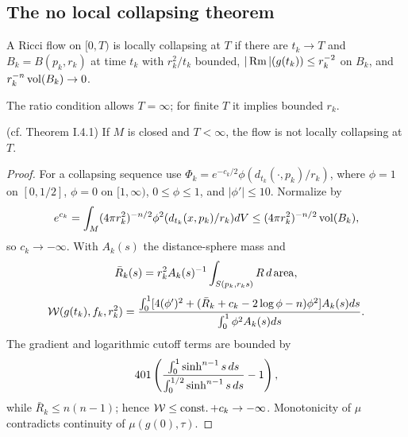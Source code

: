 \subsection{The no local collapsing theorem}
\begin{definition}
  \label{def:kl-no-local-collapsing-theorem-i-locally-collapsing-definition}
A Ricci flow on $[0,T)$ is locally collapsing at $T$ if there are $t_k\to T$ and
$B_k=B(p_k,r_k)$ at time $t_k$ with $r_k^2/t_k$ bounded,
$|\operatorname{Rm}|(g(t_k))\le r_k^{-2}$ on $B_k$, and $r_k^{-n}\operatorname{vol}(B_k)\to0$.
\end{definition}
\begin{remark}
  \label{rem:kl-no-local-collapsing-theorem-i-estimates-noncollapsing}
The ratio condition allows $T=\infty$; for finite $T$ it implies bounded $r_k$.
\end{remark}
\begin{theorem}
  \label{thm:kl-no-local-collapsing-theorem-i-noncollapsing-theorem}
  \label{noncollthm} (cf. Theorem I.4.1)
If $M$ is closed and $T<\infty$, the flow is not locally collapsing at $T$.
\end{theorem}
\begin{proof}
\sketch
For a collapsing sequence use $\Phi_k=e^{-c_k/2}\phi(d_{t_k}(\cdot,p_k)/r_k)$, where
$\phi=1$ on $[0,1/2]$, $\phi=0$ on $[1,\infty)$, $0\le\phi\le1$, and
$|\phi'|\le10$. Normalize by
\begin{equation}\label{normalization}
e^{c_k}=\int_M(4\pi r_k^2)^{-n/2}\phi^2(d_{t_k}(x,p_k)/r_k)dV
\le(4\pi r_k^2)^{-n/2}\operatorname{vol}(B_k),
\end{equation}
so $c_k\to-\infty$. With $A_k(s)$ the distance-sphere mass and
\begin{equation}
\bar R_k(s)=r_k^2A_k(s)^{-1}\int_{S(p_k,r_ks)}R\,d\operatorname{area},
\end{equation}
\begin{equation}\label{mess}
{\mathcal W}(g(t_k),f_k,r_k^2)=
{\int_0^1[4(\phi')^2+(\bar R_k+c_k-2\log\phi-n)\phi^2]A_k(s)ds\over\int_0^1\phi^2A_k(s)ds}.
\end{equation}
The gradient and logarithmic cutoff terms are bounded by
\begin{equation}
401\left({\int_0^1\sinh^{n-1}s\,ds\over\int_0^{1/2}\sinh^{n-1}s\,ds}-1\right),
\end{equation}
while $\bar R_k\le n(n-1)$; hence ${\mathcal W}\le\operatorname{const.}+c_k\to-\infty$.
Monotonicity of $\mu$ contradicts continuity of $\mu(g(0),\tau)$.
\end{proof}

